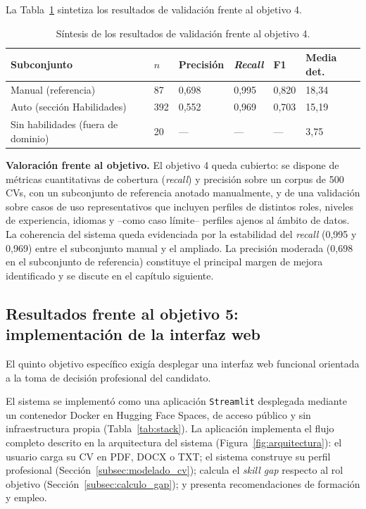 La Tabla~\ref{tab:resumen_validacion} sintetiza los resultados de validación frente al objetivo 4.

\begin{table}[H]
  \caption{Síntesis de los resultados de validación frente al objetivo 4.}
  \label{tab:resumen_validacion}
  \centering
  \footnotesize
  \begin{tabular}{|p{4.5cm}|p{1.2cm}|p{2.0cm}|p{2.0cm}|p{2.0cm}|p{2.0cm}|}
    \hline
    \rowcolor{gray!15}
    \textbf{Subconjunto} & \textbf{$n$} & \textbf{Precisión} & \textbf{\textit{Recall}} & \textbf{F1} & \textbf{Media det.} \\
    \hline
    Manual (referencia)               & 87  & 0{,}698 & 0{,}995 & 0{,}820 & 18{,}34 \\
    \hline
    Auto (sección Habilidades)        & 392 & 0{,}552 & 0{,}969 & 0{,}703 & 15{,}19 \\
    \hline
    Sin habilidades (fuera de dominio) & 20  & ---     & ---     & ---     & 3{,}75 \\
    \hline
  \end{tabular}
\end{table}

\textbf{Valoración frente al objetivo.} El objetivo 4 queda cubierto: se dispone de métricas cuantitativas de cobertura (\textit{recall}) y precisión sobre un corpus de 500 CVs, con un subconjunto de referencia anotado manualmente, y de una validación sobre casos de uso representativos que incluyen perfiles de distintos roles, niveles de experiencia, idiomas y --como caso límite-- perfiles ajenos al ámbito de datos. La coherencia del sistema queda evidenciada por la estabilidad del \textit{recall} (0,995 y 0,969) entre el subconjunto manual y el ampliado. La precisión moderada (0,698 en el subconjunto de referencia) constituye el principal margen de mejora identificado y se discute en el capítulo siguiente.

\subsection{Resultados frente al objetivo 5: implementación de la interfaz web}
\label{subsec:resultados_obj5}
El quinto objetivo específico exigía desplegar una interfaz web funcional orientada a la toma de decisión profesional del candidato.

El sistema se implementó como una aplicación \texttt{Streamlit} desplegada mediante un contenedor Docker en Hugging Face Spaces, de acceso público y sin infraestructura propia (Tabla~\ref{tab:stack}). La aplicación implementa el flujo completo descrito en la arquitectura del sistema (Figura~\ref{fig:arquitectura}): el usuario carga su CV en PDF, DOCX o TXT; el sistema construye su perfil profesional (Sección~\ref{subsec:modelado_cv}); calcula el \textit{skill gap} respecto al rol objetivo (Sección~\ref{subsec:calculo_gap}); y presenta recomendaciones de formación y empleo.

